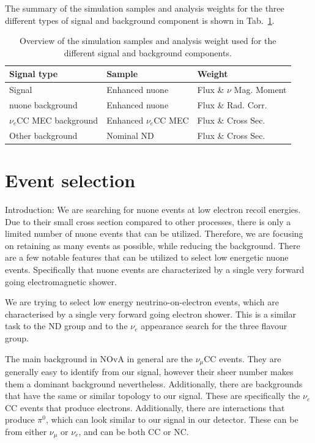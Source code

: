 The summary of the simulation samples and analysis weights for the three different types of signal and background component is shown in Tab.~\ref{tab:NuMMSamplesAndWeightsOverview}.

\begin{table}[!ht]
\centering
\caption{Overview of the simulation samples and analysis weight used for the different signal and background components.}
\def\arraystretch{1.4}
\begin{tabular}{l@{\hskip 1cm}l@{\hskip 1cm}l}
Signal type            & Sample               & Weight\\\hline
Signal                 & Enhanced \gls{nuone} & Flux \& $\nu$ Mag. Moment\\
\gls{nuone} background & Enhanced \gls{nuone} & Flux \& Rad. Corr.\\
$\nu_e$\gls{CC} \gls{MEC} background & Enhanced $\nu_e$\gls{CC} \gls{MEC} & Flux \& Cross Sec.\\
Other background       & Nominal \gls{ND}     & Flux \& Cross Sec.
\end{tabular}
\label{tab:NuMMSamplesAndWeightsOverview}
\end{table}

\section{Event selection}\label{sec:NuMMEventSelection}

Introduction: We are searching for \gls{nuone} events at low electron recoil energies. Due to their small cross section compared to other processes, there is only a limited number of \gls{nuone} events that can be utilized. Therefore, we are focusing on retaining as many events as possible, while reducing the background. There are a few notable features that can be utilized to select low energetic \gls{nuone} events. Specifically that \gls{nuone} events are characterized by a single very forward going electromagnetic shower.

We are trying to select low energy neutrino-on-electron events, which are characterised by a single very forward going electron shower. This is a similar task to the ND group and to the $\nu_e$ appearance search for the three flavour group.

The main background in \gls{NOvA} in general are the $\nu_\mu$\gls{CC} events. They are generally easy to identify from our signal, however their sheer number makes them a dominant background nevertheless. Additionally, there are backgrounds that have the same or similar topology to our signal. These are specifically the $\nu_e$\gls{CC} events that produce electrons. Additionally, there are interactions that produce $\pi^0$, which can look similar to our signal in our detector. These can be from either $\nu_\mu$ or $\nu_e$, and can be both \gls{CC} or \gls{NC}.

